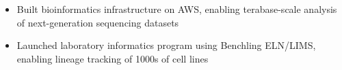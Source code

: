 \documentclass[letterpaper,10pt]{article}
\begin{document}
\begin{itemize}
\begin{itemize}
			\item Built bioinformatics infrastructure on AWS, enabling terabase-scale analysis of next-generation sequencing datasets
			\item Launched laboratory informatics program using Benchling ELN/LIMS, enabling lineage tracking of 1000s of cell lines
		\end{itemize}
		

\end{itemize}
\end{document}
